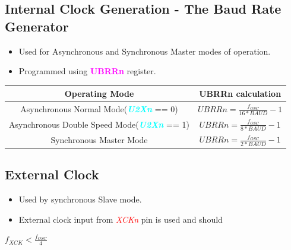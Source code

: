 \documentclass{article}
\newcommand{\bitFormat}[1]{\emph{\textbf{\textcolor{cyan}{#1}}}}
\newcommand{\regFormat}[1]{\textbf{\textcolor{magenta}{#1}}}
\newcommand{\pinFormat}[1]{\emph{\textcolor{red}{#1}}}
\begin{document}
\subsection{Internal Clock Generation - The Baud Rate Generator}
\begin{itemize}
    \item Used for Asynchronous and Synchronous Master modes of operation.
    \item Programmed using \regFormat{UBRRn} register.
\end{itemize}

\begin{table}[H]
    \begin{center}
        \begin{tabular}{c|c}
            \textbf{Operating Mode} & \textbf{UBRRn calculation}\\
            \hline
            Asynchronous Normal Mode(\bitFormat{U2Xn} == 0) & $UBRRn = \frac{f_{OSC}}{16 * BAUD} - 1$\\
            Asynchronous Double Speed Mode(\bitFormat{U2Xn} == 1) & $UBRRn = \frac{f_{OSC}}{8 * BAUD} - 1$\\
            Synchronous Master Mode & $UBRRn = \frac{f_{OSC}}{2 * BAUD} - 1$\\
        \end{tabular}
    \end{center}
\end{table}

\subsection{External Clock}
\begin{itemize}
    \item Used by synchronous Slave mode.
    \item External clock input from \pinFormat{XCKn} pin is used and should
\end{itemize}
\begin{center}
    $f_{XCK} < \frac{f_{OSC}}{4}$
\end{center}
\end{document}
